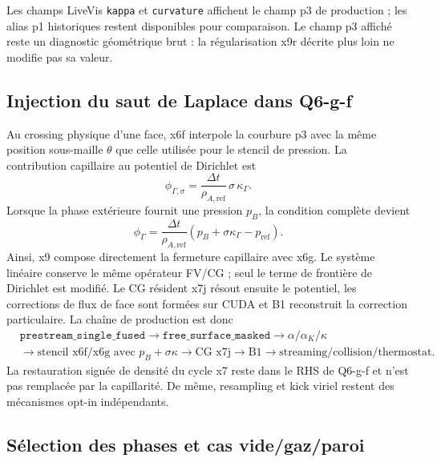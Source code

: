 \documentclass[11pt,a4paper]{article}
\begin{document}
Les champs LiveVis \texttt{kappa} et \texttt{curvature} affichent le champ p3 de production ; les alias p1 historiques restent disponibles pour comparaison. Le champ p3 affiché reste un diagnostic géométrique brut : la régularisation x9r décrite plus loin ne modifie pas sa valeur.

\subsection{Injection du saut de Laplace dans Q6-g-f}

Au crossing physique d'une face, x6f interpole la courbure p3 avec la même position sous-maille $\theta$ que celle utilisée pour le stencil de pression. La contribution capillaire au potentiel de Dirichlet est
\begin{equation}
  \phi_{\Gamma,\sigma}
  =\frac{\Delta t}{\rho_{A,\mathrm{ref}}}\,\sigma\,\kappa_{\Gamma}.
  \label{eq:x9_phi_cap}
\end{equation}
Lorsque la phase extérieure fournit une pression $p_B$, la condition complète devient
\begin{equation}
  \phi_{\Gamma}
  =\frac{\Delta t}{\rho_{A,\mathrm{ref}}}
   \left(p_B+\sigma\kappa_{\Gamma}-p_{\mathrm{ref}}\right).
  \label{eq:x9_phi_full}
\end{equation}
Ainsi, x9 compose directement la fermeture capillaire avec x6g. Le système linéaire conserve le même opérateur FV/CG ; seul le terme de frontière de Dirichlet est modifié. Le CG résident x7j résout ensuite le potentiel, les corrections de flux de face sont formées sur CUDA et B1 reconstruit la correction particulaire. La chaîne de production est donc
\begin{equation}
\begin{split}
 &\texttt{prestream\_single\_fused}
 \rightarrow \texttt{free\_surface\_masked}
 \rightarrow \alpha/\alpha_K/\kappa\\
 &\rightarrow \text{stencil x6f/x6g avec }p_B+\sigma\kappa
 \rightarrow \text{CG x7j}
 \rightarrow \text{B1}
 \rightarrow \text{streaming/collision/thermostat}.
\end{split}
\end{equation}
La restauration signée de densité du cycle x7 reste dans le RHS de Q6-g-f et n'est pas remplacée par la capillarité. De même, resampling et kick viriel restent des mécanismes opt-in indépendants.

\subsection{Sélection des phases et cas vide/gaz/paroi}
\end{document}
